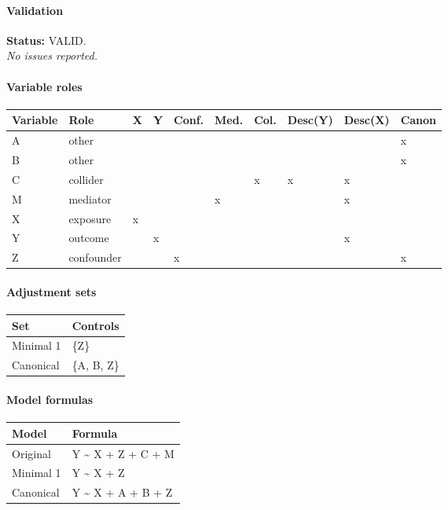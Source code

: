 \begingroup\small
\paragraph{Validation}
\textbf{Status:} VALID.
\\[2pt]\textit{No issues reported.}

\paragraph{Variable roles}
\begin{center}
\setlength{\LTleft}{0pt}\setlength{\LTright}{0pt}
\begin{longtable}{@{ }l l l l l l l l l l@{ }}
\toprule
Variable & Role & X & Y & Conf. & Med. & Col. & Desc(Y) & Desc(X) & Canon \\
\midrule
{A} & {other} &  &  &  &  &  &  &  & {x} \\
{B} & {other} &  &  &  &  &  &  &  & {x} \\
{C} & {collider} &  &  &  &  & {x} & {x} & {x} &  \\
{M} & {mediator} &  &  &  & {x} &  &  & {x} &  \\
{X} & {exposure} & {x} &  &  &  &  &  &  &  \\
{Y} & {outcome} &  & {x} &  &  &  &  & {x} &  \\
{Z} & {confounder} &  &  & {x} &  &  &  &  & {x} \\
\bottomrule
\end{longtable}
\end{center}

\paragraph{Adjustment sets}
\begin{center}
\setlength{\LTleft}{0pt}\setlength{\LTright}{0pt}
\begin{longtable}{@{ }l l@{ }}
\toprule
Set & Controls \\
\midrule
{Minimal 1} & {\{Z\}} \\
{Canonical} & {\{A, B, Z\}} \\
\bottomrule
\end{longtable}
\end{center}

\paragraph{Model formulas}
\begin{center}
\setlength{\LTleft}{0pt}\setlength{\LTright}{0pt}
\begin{longtable}{@{ }l p{}@{ }}
\toprule
Model & Formula \\
\midrule
{Original} & {Y \textasciitilde{} X + Z + C + M} \\
{Minimal 1} & {Y \textasciitilde{} X + Z} \\
{Canonical} & {Y \textasciitilde{} X + A + B + Z} \\
\bottomrule
\end{longtable}
\end{center}


